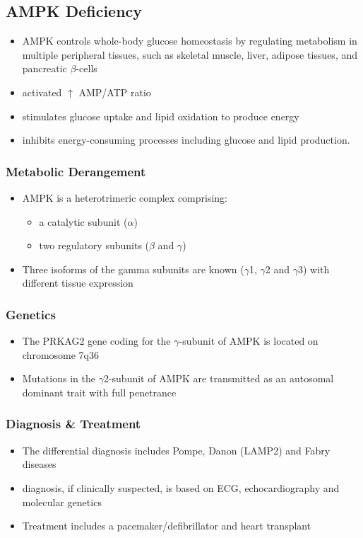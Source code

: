 \documentclass{scrartcl}
\begin{document}
\subsection{AMPK Deficiency}
\label{sec:org767e087}
\begin{itemize}
\item AMPK controls whole-body glucose homeostasis by regulating metabolism in multiple peripheral tissues, such as
skeletal muscle, liver, adipose tissues, and pancreatic \(\beta\)-cells
\item activated \(\uparrow\) AMP/ATP ratio
\item stimulates glucose uptake and lipid oxidation to produce energy
\item inhibits energy-consuming processes including glucose and lipid production.
\end{itemize}

\subsubsection{Metabolic Derangement}
\label{sec:orgfea7e0b}
\begin{itemize}
\item AMPK is a heterotrimeric complex comprising:
\begin{itemize}
\item a catalytic subunit (\(\alpha\))
\item two regulatory subunits (\(\beta\) and \(\gamma\))
\end{itemize}
\item Three isoforms of the gamma subunits are known (\(\gamma\)1, \(\gamma\)2 and \(\gamma\)3) with different tissue
expression
\end{itemize}

\subsubsection{Genetics}
\label{sec:org995f04d}
\begin{itemize}
\item The PRKAG2 gene coding for the \(\gamma\)-subunit of AMPK is located on chromosome 7q36
\item Mutations in the \(\gamma\)2-subunit of AMPK are transmitted as an
autosomal dominant trait with full penetrance
\end{itemize}

\subsubsection{Diagnosis \& Treatment}
\label{sec:orgb7c6eb0}
\begin{itemize}
\item The differential diagnosis includes Pompe, Danon (LAMP2) and Fabry diseases
\item diagnosis, if clinically suspected, is based on ECG,
echocardiography and molecular genetics
\item Treatment includes a pacemaker/defibrillator and heart transplant
\end{itemize}
\end{document}
